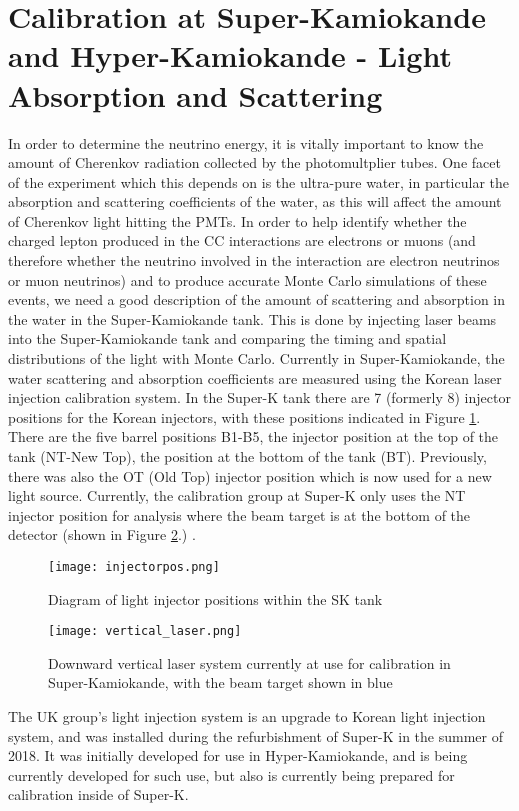 \documentclass[11pt,oneside,a4paper]{article}
\begin{document}
\section{Calibration at Super-Kamiokande and Hyper-Kamiokande - Light Absorption and Scattering}
In order to determine the neutrino energy, it is vitally important to know the amount of Cherenkov radiation collected by the photomultplier tubes. One facet of the experiment which this depends on is the ultra-pure water, in particular the absorption and scattering coefficients of the water, as this will affect the amount of Cherenkov light hitting the PMTs. In order to help identify whether the charged lepton produced in the CC interactions are electrons or muons (and therefore whether the neutrino involved in the interaction are electron neutrinos or muon neutrinos) and to produce accurate Monte Carlo simulations of these events, we need a good description of the amount of scattering and absorption in the water in the Super-Kamiokande tank. This is done by injecting laser beams into the Super-Kamiokande tank and comparing the timing and spatial distributions of the light with Monte Carlo. Currently in Super-Kamiokande, the water scattering and absorption coefficients are measured using the Korean laser injection calibration system. In the Super-K tank there are 7 (formerly 8) injector positions for the Korean injectors, with these positions indicated in Figure \ref{fig:injectorpos}. There are the five barrel positions B1-B5, the injector position at the top of the tank (NT-New Top), the position at the bottom of the tank (BT). Previously, there was also the OT (Old Top) injector position which is now used for a new light source. Currently, the calibration group at Super-K only uses the NT injector position for analysis where the beam target is at the bottom of the detector (shown in Figure \ref{fig:NTcalib}.) \cite{skcalibration}. 

\begin{figure}[htbp]
	\centering
	\texttt{[image: injectorpos.png]}
	\caption{Diagram of light injector positions within the SK tank}
	\label{fig:injectorpos}
\end{figure}

\begin{figure}[htbp]
	\centering
	\texttt{[image: vertical\_laser.png]}
	\caption{Downward vertical laser system currently at use for calibration in Super-Kamiokande, with the beam target shown in blue}
	\label{fig:NTcalib}
\end{figure}
The UK group's light injection system is an upgrade to Korean light injection system, and was installed during the refurbishment of Super-K in the summer of 2018. It was initially developed for use in Hyper-Kamiokande, and is being currently developed for such use, but also is currently being prepared for calibration inside of Super-K. 
\end{document}
